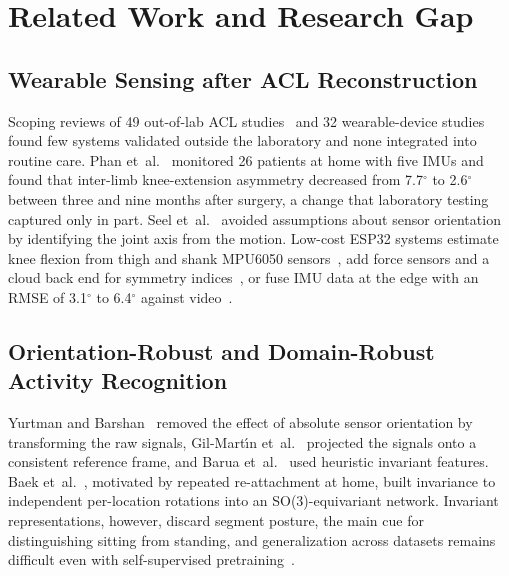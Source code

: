 \documentclass[conference]{IEEEtran}
\begin{document}
\section{Related Work and Research Gap}

\subsection{Wearable Sensing after ACL Reconstruction}
Scoping reviews of 49 out-of-lab ACL studies~\cite{tan2023} and 32 wearable-device studies~\cite{ptaszyk2025} found few systems validated outside the laboratory and none integrated into routine care. Phan et~al.~\cite{phan2026} monitored 26 patients at home with five IMUs and found that inter-limb knee-extension asymmetry decreased from 7.7$^\circ$ to 2.6$^\circ$ between three and nine months after surgery, a change that laboratory testing captured only in part. Seel et~al.~\cite{seel2014} avoided assumptions about sensor orientation by identifying the joint axis from the motion. Low-cost ESP32 systems estimate knee flexion from thigh and shank MPU6050 sensors~\cite{korbel2026}, add force sensors and a cloud back end for symmetry indices~\cite{joshita2026}, or fuse IMU data at the edge with an RMSE of 3.1$^\circ$ to 6.4$^\circ$ against video~\cite{achmamad2025}.

\subsection{Orientation-Robust and Domain-Robust Activity Recognition}
Yurtman and Barshan~\cite{yurtman2017} removed the effect of absolute sensor orientation by transforming the raw signals, Gil-Mart\'{\i}n et~al.~\cite{gilmartin2023} projected the signals onto a consistent reference frame, and Barua et~al.~\cite{barua2024} used heuristic invariant features. Baek et~al.~\cite{baek2026}, motivated by repeated re-attachment at home, built invariance to independent per-location rotations into an SO(3)-equivariant network. Invariant representations, however, discard segment posture, the main cue for distinguishing sitting from standing, and generalization across datasets remains difficult even with self-supervised pretraining~\cite{hong2024,napoli2024}.
\end{document}

